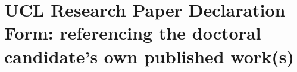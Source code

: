 





% 
	
\section*{UCL Research Paper Declaration Form: referencing the doctoral candidate’s own published work(s)}
	


